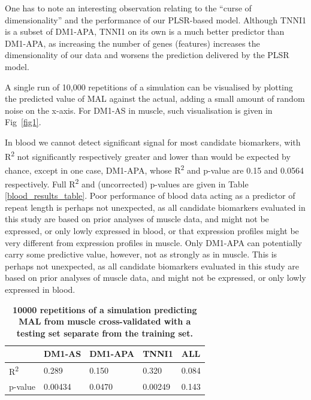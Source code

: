 \documentclass[10pt,letterpaper]{article}
\begin{document}
One has to note an interesting observation relating to the ``curse of dimensionality'' and the performance of our PLSR-based model. Although TNNI1 is a subset of DM1-APA, TNNI1 on its own is a much better predictor than DM1-APA, as increasing the number of genes (features) increases the dimensionality of our data and worsens the prediction delivered by the PLSR model.

A single run of 10,000 repetitions of a simulation can be visualised by plotting the predicted value of MAL against the actual, adding a small amount of random noise on the x-axis. For DM1-AS in muscle, such visualisation is given in Fig~\ref{fig1}. 

In blood we cannot detect significant signal for most candidate biomarkers, with R\textsuperscript{2} not significantly respectively greater and lower than would be expected by chance, except in one case, DM1-APA, whose R\textsuperscript{2} and p-value are 0.15 and 0.0564 respectively. Full R\textsuperscript{2} and (uncorrected) p-values are given in Table \ref{blood_results_table}. Poor performance of blood data acting as a predictor of repeat length is perhaps not unexpected, as all candidate biomarkers evaluated in this study are based on prior analyses of muscle data, and might not be expressed, or only lowly expressed in blood, or that expression profiles might be very different from expression profiles in muscle. Only DM1-APA can potentially carry some predictive value, however, not as strongly as in muscle. This is perhaps not unexpected, as all candidate biomarkers evaluated in this study are based on prior analyses of muscle data, and might not be expressed, or only lowly expressed in blood.


\begin{table}[!ht]
\begin{adjustwidth}{-2.25in}{0in} %
\centering
\caption{{\bf 10000 repetitions of a simulation predicting MAL from muscle cross-validated with a testing set separate from the training set.}}

\begin{tabular}{|l|l|l|l|l|}
\hline
 & DM1-AS & DM1-APA & TNNI1 & ALL \\ \hline
R\textsuperscript{2} & 0.289 & 0.150 & 0.320 & 0.084 \\ \hline
p-value & 0.00434 & 0.0470 & 0.00249 & 0.143 \\ \hline
\end{tabular}

\label{muscle_results_table}
\end{adjustwidth}
\end{table}
\end{document}

